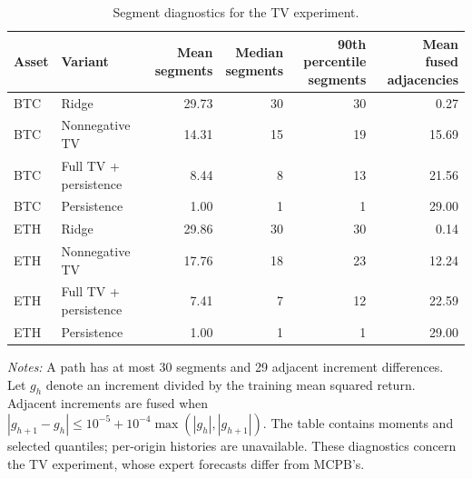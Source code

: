 \begin{table}[tbp]
\centering\small
\setlength{\tabcolsep}{4pt}
\renewcommand{\arraystretch}{1.12}
\caption{Segment diagnostics for the TV experiment.}
\label{tab:legacy_shape}
\begin{tabular}{llrrrr}
\toprule
Asset & Variant & \shortstack{Mean\\segments} & \shortstack{Median\\segments} & \shortstack{90th percentile\\segments} & \shortstack{Mean\\fused adjacencies} \\
\midrule
BTC & Ridge & 29.73 & 30 & 30 & 0.27 \\
BTC & Nonnegative TV & 14.31 & 15 & 19 & 15.69 \\
BTC & Full TV + persistence & 8.44 & 8 & 13 & 21.56 \\
BTC & Persistence & 1.00 & 1 & 1 & 29.00 \\
ETH & Ridge & 29.86 & 30 & 30 & 0.14 \\
ETH & Nonnegative TV & 17.76 & 18 & 23 & 12.24 \\
ETH & Full TV + persistence & 7.41 & 7 & 12 & 22.59 \\
ETH & Persistence & 1.00 & 1 & 1 & 29.00 \\
\bottomrule
\end{tabular}
\par\smallskip
\begin{minipage}{0.98\linewidth}\footnotesize
\textit{Notes:} A path has at most 30 segments and 29 adjacent increment differences. Let $g_h$ denote an increment divided by the training mean squared return. Adjacent increments are fused when $|g_{h+1}-g_h|\le10^{-5}+10^{-4}\max(|g_h|,|g_{h+1}|)$. The table contains moments and selected quantiles; per-origin histories are unavailable. These diagnostics concern the TV experiment, whose expert forecasts differ from MCPB's.
\end{minipage}
\end{table}
